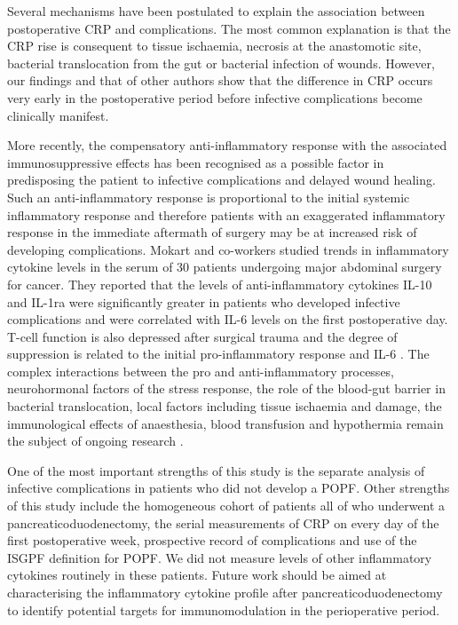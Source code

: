 Several mechanisms have been postulated to explain the association between postoperative CRP and complications. The most common explanation is that the CRP rise is consequent to tissue ischaemia, necrosis at the anastomotic site, bacterial translocation from the gut or bacterial infection of wounds. However, our findings and that of other authors show that the difference in CRP occurs very early in the postoperative period before infective complications become clinically manifest. 

More recently, the compensatory anti-inflammatory response with the associated immunosuppressive effects has been recognised as a possible factor in predisposing the patient to infective complications and delayed wound healing. Such an anti-inflammatory response is proportional to the initial systemic inflammatory response and therefore patients with an exaggerated inflammatory response in the immediate aftermath of surgery may be at increased risk of developing complications. Mokart and co-workers studied trends in inflammatory cytokine levels in the serum of 30 patients undergoing major abdominal surgery for cancer. They reported that the levels of anti-inflammatory cytokines IL-10 and IL-1ra were significantly greater in patients who developed infective complications and were correlated with IL-6 levels on the first postoperative day. T-cell function is also depressed after surgical trauma and the degree of suppression is related to the initial pro-inflammatory response and IL-6 \parencite{faist_immunosuppression_1997}. The complex interactions between the pro and anti-inflammatory processes, neurohormonal factors of the stress response, the role of the blood-gut barrier in bacterial translocation, local factors including tissue ischaemia and damage, the immunological effects of anaesthesia, blood transfusion and hypothermia remain the subject of ongoing research \parencite{buttenschoen_effect_2010}.

One of the most important strengths of this study is the separate analysis of infective complications in patients who did not develop a POPF. Other strengths of this study include the homogeneous cohort of patients all of who underwent a pancreaticoduodenectomy, the serial measurements of CRP on every day of the first postoperative week, prospective record of complications and use of the ISGPF definition for POPF. We did not measure levels of other inflammatory cytokines routinely in these patients. Future work should be aimed at characterising the inflammatory cytokine profile after pancreaticoduodenectomy to identify potential targets for immunomodulation in the perioperative period. 

